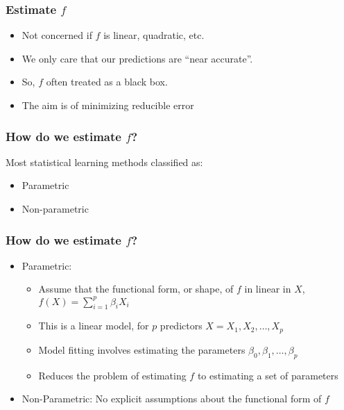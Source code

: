 \begin{frame}[fragile]\frametitle{Estimate $f$}
\begin{itemize}
\item Not concerned if $f$ is linear, quadratic, etc.
\item We only care that our predictions are ``near accurate''.
\item So, $f$ often treated as a black box. 
\item The aim is of minimizing reducible error
\end{itemize}
\end{frame}


\begin{frame}[fragile]\frametitle{How do we estimate $f$?}
Most statistical learning methods classified as:
	\begin{itemize}
	\item Parametric
	\item Non-parametric
	\end{itemize}
\end{frame}

\begin{frame}[fragile]\frametitle{How do we estimate $f$?}
\begin{itemize}
\item Parametric:
	\begin{itemize}
	\item Assume that the functional form, or shape, of $f$ in linear in $X$, $f(X) = \sum_{i=1}^p \beta_i X_i$
	\item This is a linear model, for $p$ predictors $X = {X_1, X_2,\ldots, X_p}$
	\item Model fitting involves estimating the parameters $\beta_0, \beta_1,\ldots,\beta_p$
	\item Reduces the problem of estimating $f$ to estimating a set of parameters
	\end{itemize}
\item Non-Parametric: No explicit assumptions about the functional form of $f$
\end{itemize}
\end{frame}

